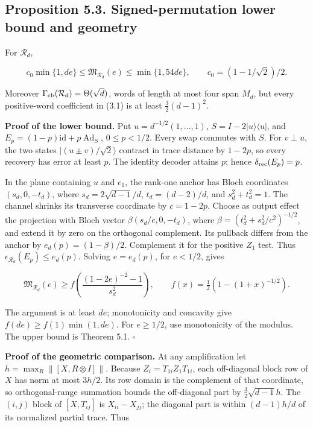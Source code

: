 \documentclass[11pt]{article}
\begin{document}
\subsection*{Proposition 5.3. Signed-permutation lower bound and geometry}

For \(\mathcal R_d\),

\[
c_0\min\{1,de\}\le\mathfrak M_{\mathcal R_d}(e)
\le\min\{1,54de\},\qquad c_0=(1-1/\sqrt2)/2.
\tag{5.7}
\]

Moreover \(\Gamma_{\rm cb}(\mathcal R_d)=\Theta(\sqrt d)\), words of
length at most four span \(M_d\), but every positive-word coefficient in
(3.1) is at least \(\tfrac32(d-1)^2\).

\textbf{Proof of the lower bound.} Put \(u=d^{-1/2}(1,\ldots,1)\),
\(S=I-2|u\rangle\langle u|\), and
\(E_p=(1-p)\mathrm{id}+p\operatorname{Ad}_S\), \(0\le p<1/2\).
Every swap commutes with \(S\). For \(v\perp u\), the two states
\(|(u\pm v)/\sqrt2\rangle\) contract in trace distance by \(1-2p\),
so every recovery has error at least \(p\). The identity decoder attains
\(p\); hence \(\delta_{\rm rec}(E_p)=p\).

In the plane containing \(u\) and \(e_1\), the rank-one anchor has Bloch
coordinates \((s_d,0,-t_d)\), where
\(s_d=2\sqrt{d-1}/d\), \(t_d=(d-2)/d\), and \(s_d^2+t_d^2=1\).
The channel shrinks its transverse coordinate by \(c=1-2p\). Choose as
output effect the projection with Bloch vector
\(\beta(s_d/c,0,-t_d)\), where
\(\beta=(t_d^2+s_d^2/c^2)^{-1/2}\), and extend it by zero on the
orthogonal complement. Its pullback differs from the anchor by
\(e_d(p)=(1-\beta)/2\). Complement it for the positive \(Z_1\) test.
Thus \(\epsilon_{\mathcal R_d}(E_p)\le e_d(p)\).
Solving \(e=e_d(p)\), for \(e<1/2\), gives

\[
\mathfrak M_{\mathcal R_d}(e)\ge
f\left(\frac{(1-2e)^{-2}-1}{s_d^2}\right),
\qquad f(x)=\tfrac12(1-(1+x)^{-1/2}).
\]

The argument is at least \(de\); monotonicity and concavity give
\(f(de)\ge f(1)\min(1,de)\). For \(e\ge1/2\), use monotonicity of the
modulus. The upper bound is Theorem 5.1. \hfill\(\square\)

\textbf{Proof of the geometric comparison.} At any amplification let
\(h=\max_R\|[X,R\otimes I]\|\). Because
\(Z_i=T_{1i}Z_1T_{1i}\), each off-diagonal block row of \(X\) has norm
at most \(3h/2\). Its row domain is the complement of that coordinate, so
orthogonal-range summation bounds the off-diagonal part by
\(\tfrac32\sqrt{d-1}h\). The \((i,j)\) block of \([X,T_{ij}]\) is
\(X_{ii}-X_{jj}\); the diagonal part is within \((d-1)h/d\) of its
normalized partial trace. Thus
\end{document}
